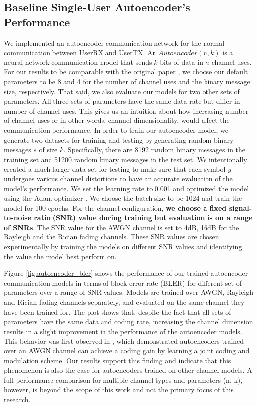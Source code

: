\subsection{Baseline Single-User Autoencoder's Performance}
We implemented an autoencoder communication network for the normal communication between UserRX and UserTX. An \(Autoencoder (n, k)\) is a neural network communication model that sends \(k\) bits of data in \(n\) channel uses. For our results to be comparable with the original paper \cite{o2017introduction}, we choose our default parameters to be 8 and 4 for the number of channel uses and the binary message size, respectively. That said, we also evaluate our models for two other sets of parameters. All three sets of parameters have the same data rate but differ in number of channel uses. This gives us an intuition about how increasing number of channel uses or in other words, channel dimensionality, would affect the communication performance. In order to train our autoencoder model, we generate two datasets for training and testing by generating random binary messages \(s\) of size \(k\). Specifically, there are 8192 random binary messages in the training set and 51200 random binary messages in the test set. We intentionally created a much larger data set for testing to make sure that each symbol \(y\) undergoes various channel distortions to have an accurate evaluation of the model's performance. We set the learning rate to 0.001 and optimized the model using the Adam optimizer \cite{kingma2014adam}. We choose the batch size to be 1024 and train the model for 100 epochs. For the channel configuration, \textbf{we choose a fixed signal-to-noise ratio (SNR) value during training but evaluation is on a range of SNRs}. The SNR value for the AWGN channel is set to 4dB, 16dB for the Rayleigh and the Rician fading channels. These SNR values are chosen experimentally by training the models on different SNR values and identifying the value the model best perform on.

Figure \ref{fig:autoencoder_bler} shows the performance of our trained autoencoder communication models in terms of block error rate (BLER) for different set of parameters over a range of SNR values. Models are trained over AWGN, Rayleigh and Rician fading channels separately, and evaluated on the same channel they have been trained for. The plot shows that, despite the fact that all sets of parameters have the same data and coding rate, increasing the channel dimension results in a slight improvement in the performance of the autoencoder models. This behavior was first observed in \cite{o2017introduction}, which demonstrated autoencoders trained over an AWGN channel can achieve a coding gain by learning a joint coding and modulation scheme. Our results support this finding and indicate that this phenomenon is also the case for autoencoders trained on other channel models. A full performance comparison for multiple channel types and parameters (n, k), however, is beyond the scope of this work and not the primary focus of this research.

